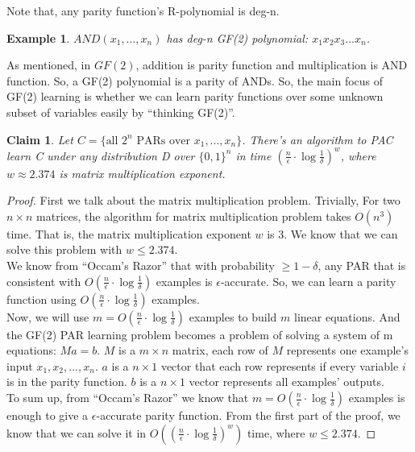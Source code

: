 \documentclass[12pt]{article}
\newtheorem{claim}[theorem]{Claim}
\newtheorem{example}[theorem]{Example}
\newcommand{\cald}{{\cal D}}
\begin{document}
Note that, any parity function's R-polynomial is deg-n. 

\begin{example}
$AND(x_1,...,x_n)$ has deg-n GF(2) polynomial: $x_1x_2x_3...x_n$.
\end{example}

As mentioned, in $GF(2)$, addition is parity function and
multiplication is AND function. So, a GF(2) polynomial is a parity of
ANDs. So, the main focus of GF(2) learning is whether we can 
learn parity functions over some unknown subset of variables easily by
``thinking GF(2)''.

\begin{claim}
Let $C = \{ \text {all } 2^n \text { PARs over } x_1,...,x_n
\}$. There's an algorithm to PAC learn C under any distribution \cald
over $\{ 0, 1\}^n$ in time $(\frac {n}{\epsilon} \cdot \log {\frac
  {1}{\delta}})^w$, where $w \approx 2.374$ is matrix multiplication
exponent.
\end{claim}

\begin{proof}
First we talk about the matrix multiplication problem. Trivially,
For two $n \times n$ matrices, the algorithm for matrix multiplication
problem takes $O(n^3)$ time. That is, the matrix multiplication
exponent $w$ is 3. We know that we can solve this problem with $w \le
2.374$. \\

We know from ``Occam's Razor'' that with  probability $\ge 1 -
\delta$, any PAR that is consistent with $O(\frac {n}{\epsilon} \cdot
\log {\frac {1}{\delta}})$ examples is $\epsilon$-accurate. So, we
can learn a parity function using $O(\frac {n}{\epsilon} \cdot \log
{\frac {1}{\delta}})$ examples. \\

Now, we will use $m = O(\frac {n}{\epsilon} \cdot \log {\frac
  {1}{\delta}})$ examples to build $m$ linear equations. And the GF(2)
PAR learning problem becomes a problem of solving a system of m
equations: $Ma = b$. $M$ is a $m \times n$ matrix, each row of $M$
represents one example's input $x_1, x_2, ..., x_n$. $a$ is a $n
\times 1$ vector that each row represents if every variable $i$ is in
the parity function. $b$ is a $n \times 1$ vector represents all
examples' outputs. \\

To sum up, from ``Occam's Razor'' we know that $m = O(\frac
{n}{\epsilon} \cdot \log {\frac {1}{\delta}})$ examples is enough to
give a $\epsilon$-accurate parity function. From the first part of the
proof, we know that we can solve it in $O((\frac {n}{\epsilon} \cdot
\log {\frac {1}{\delta}})^w)$ time, where $w \le 2.374$. 
\end{proof}
\end{document}
